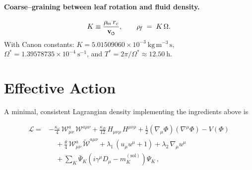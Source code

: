 \documentclass[smallextended]{svjour3}       %
\newcommand{\swirlarrow}{%
	\mathchoice{\mkern-2mu\scriptstyle\boldsymbol{\circlearrowleft}}%
	{\mkern-2mu\scriptstyle\boldsymbol{\circlearrowleft}}%
	{\mkern-2mu\scriptscriptstyle\boldsymbol{\circlearrowleft}}%
	{\mkern-2mu\scriptscriptstyle\boldsymbol{\circlearrowleft}}%
}
\newcommand{\vswirl}{\mathbf{v}_{\swirlarrow}}
\newcommand{\rhoF}{\rho_{\!f}}      %
\newcommand{\rhoE}{\rho_{\!E}}      %
\newcommand{\rhoM}{\rho_{\!m}}      %
\begin{document}
	\begin{table}[h]
		\centering
		\caption{Clock-sector parameters and baseline constraint.}
	\end{table}

	\paragraph{Coarse--graining between leaf rotation and fluid density.}
	\begin{equation}
		K \equiv \frac{\rhoM\, r_c}{\vswirl},
		\qquad
		\rhoF \;=\; K\,\Omega .
	\end{equation}
	With Canon constants: \(K = 5.01509060\times 10^{-3}\ \mathrm{kg\,m^{-3}\,s}\), \(\Omega^\ast = 1.39578735\times 10^{-4}\ \mathrm{s^{-1}}\), and \(T^\ast=2\pi/\Omega^\ast\approx 12.50\ \mathrm{h}\).


	\section{Effective Action}

	A minimal, consistent Lagrangian density implementing the ingredients above is

    \begin{align}
    \mathcal{L}
    =&-\frac{\kappa_\omega}{4}\,\mathcal{W}^a_{\mu\nu}\,\mathcal{W}^{a\mu\nu}
    +\frac{\kappa_B}{12}\,H_{\mu\nu\rho}\,H^{\mu\nu\rho}
    +\frac{1}{2}(\nabla_\mu\Phi)(\nabla^\mu\Phi)
    -V(\Phi) \nonumber\\
    &\quad
    +\frac{\theta}{4}\,\mathcal{W}^a_{\mu\nu}\,\tilde{\mathcal{W}}^{a\mu\nu}
    +\lambda_1\,(u_\mu u^\mu+1)
    +\lambda_2\,\nabla_\mu u^\mu \nonumber\\
    &\quad
    +\sum_K \bar\Psi_K\!\left(i\gamma^\mu D_\mu - m_K^{(\mathrm{sol})}\right)\!\Psi_K \,,
    \label{eq:EFT}
    \end{align}
\end{document}
